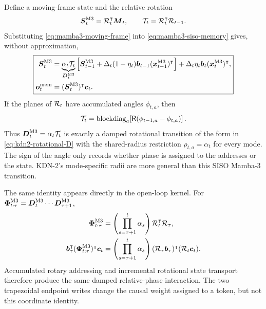 \documentclass[11pt,letterpaper,logo]{yalearxiv}
\newcommand{\blockdiag}{\operatorname{blockdiag}}
\newcommand{\Rot}{\mathsf{R}}
\begin{document}
Define a moving-frame state and the relative rotation
\begin{equation}
  \boldsymbol{S}^{\mathrm{M3}}_t=\mathcal R_t^{\intercal}\boldsymbol{M}_t,
  \qquad
  \mathcal T_t=\mathcal R_t^{\intercal}\mathcal R_{t-1}.
  \label{eq:mamba3-moving-frame}
\end{equation}
Substituting \eqref{eq:mamba3-moving-frame} into \eqref{eq:mamba3-siso-memory} gives, without
approximation,
\begin{equation}
\boxed{
\begin{aligned}
  \boldsymbol{S}^{\mathrm{M3}}_t
  &=
  \underbrace{\alpha_t\mathcal T_t}_{\boldsymbol{D}^{\mathrm{M3}}_t}
  \left[
    \boldsymbol{S}^{\mathrm{M3}}_{t-1}
    +\Delta_t(1-\eta_t)
     \boldsymbol{b}_{t-1}(\boldsymbol{x}^{\mathrm{M3}}_{t-1})^{\intercal}
  \right]
  +\Delta_t\eta_t\boldsymbol{b}_t(\boldsymbol{x}^{\mathrm{M3}}_t)^{\intercal},
  \\
  \boldsymbol{o}^{\mathrm{mem}}_t
  &=
  (\boldsymbol{S}^{\mathrm{M3}}_t)^{\intercal}\boldsymbol{c}_t.
\end{aligned}}
\label{eq:mamba3-rotational-form}
\end{equation}
If the planes of $\mathcal R_t$ have accumulated angles $\phi_{t,a}$, then
\begin{equation}
  \mc T_t
  =
  \blockdiag_a\!\left[
    \Rot(\phi_{t-1,a}-\phi_{t,a})
  \right].
  \label{eq:mamba3-relative-rotation}
\end{equation}
Thus $\boldsymbol{D}^{\mathrm{M3}}_t=\alpha_t\mathcal T_t$ is exactly a damped rotational transition of the
form in \eqref{eq:kdn2-rotational-D} with the shared-radius restriction
$\rho_{t,a}=\alpha_t$ for every mode. The sign of the angle only records whether phase is assigned
to the addresses or the state. KDN-2's mode-specific radii are more general than this SISO
Mamba-3 transition.

The same identity appears directly in the open-loop kernel. For
$\boldsymbol{\Phi}^{\mathrm{M3}}_{t:\tau}
=\boldsymbol{D}^{\mathrm{M3}}_t\cdots\boldsymbol{D}^{\mathrm{M3}}_{\tau+1}$,
\begin{equation}
\begin{aligned}
  \boldsymbol{\Phi}^{\mathrm{M3}}_{t:\tau}
  &=
  \left(\prod_{s=\tau+1}^{t}\alpha_s\right)
  \mathcal R_t^{\intercal}\mathcal R_{\tau},
  \\
  \boldsymbol{b}_{\tau}^{\intercal}
  (\boldsymbol{\Phi}^{\mathrm{M3}}_{t:\tau})^{\intercal}\boldsymbol{c}_t
  &=
  \left(\prod_{s=\tau+1}^{t}\alpha_s\right)
  (\mathcal R_{\tau}\boldsymbol{b}_{\tau})^{\intercal}
  (\mathcal R_t\boldsymbol{c}_t).
\end{aligned}
\label{eq:mamba3-relative-phase-kernel}
\end{equation}
Accumulated rotary addressing and incremental rotational state transport therefore produce the
same damped relative-phase interaction. The two trapezoidal endpoint writes change the causal
weight assigned to a token, but not this coordinate identity.
\end{document}

